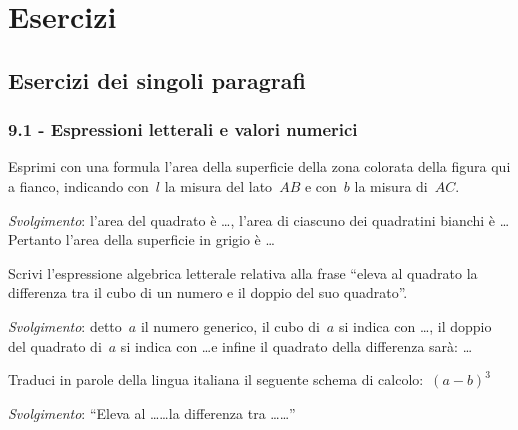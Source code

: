 \section{Esercizi}
\subsection{Esercizi dei singoli paragrafi}
\subsubsection*{9.1 - Espressioni letterali e valori numerici}

\begin{multicols}{2}
\begin{esercizio}
\label{ese:9.1}
Esprimi con una formula l'area della superficie della zona colorata della figura qui a fianco, %
indicando con~$l$ la misura del lato~$AB$ e
con~$b$ la misura di~$AC$.

\emph{Svolgimento}: l'area del quadrato è \ldots,
l'area di ciascuno dei quadratini bianchi è \ldots\, Pertanto l'area della
superficie in
grigio è \ldots
\begin{center}

\end{center}
\end{esercizio}
\end{multicols}

\begin{esercizio}
\label{ese:9.2}
Scrivi l'espressione algebrica letterale relativa alla frase ``eleva al quadrato la differenza tra il cubo di un
numero e il doppio del suo quadrato''.

\emph{Svolgimento}: detto~$a$ il numero generico, il cubo di~$a$ si indica con \ldots,
il doppio del quadrato di~$a$ si indica con \ldots e infine
il quadrato della differenza sarà: \ldots
\end{esercizio}

\begin{esercizio}
\label{ese:9.3}
Traduci in parole della lingua italiana il seguente schema di calcolo:~$(a-b)^{3}$

\emph{Svolgimento}: ``Eleva al \ldots\ldots la differenza tra \ldots\ldots''
\end{esercizio}


